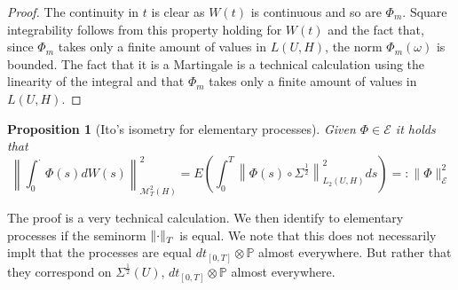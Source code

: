 \documentclass[12pt]{article}
\newtheorem{proposition}{Proposition}
\begin{document}
\begin{proof}
	The continuity in $t$ is clear as $W(t)$ is continuous and so are $\Phi_m$. Square integrability follows from this property holding for $W(t)$ and the fact that, since $\Phi_m$ takes only a finite amount of values in $L(U,H)$, the norm $\Phi_m(\omega)$ is bounded. The fact that it is a Martingale is a technical calculation using the linearity of the integral and that $\Phi_m$ takes only a finite amount of values in $L(U,H)$.
\end{proof}
\begin{proposition}[Ito's isometry for elementary processes]\label{ito elementary}
	Given $\Phi\in\mathcal{E}$ it holds that
	\begin{equation*}
		\left\|\int_{0}^\cdot \Phi(s) d W(s)\right\|_{\mathcal{M}_{T}^2(H)}^2=E\left(\int_{0}^{T}\left\|\Phi(s) \circ \Sigma^{\frac{1}{2}}\right\|_{L_2(U,H)}^2 d s\right)=:\|\Phi\|_{\mathcal{E}}^2
	\end{equation*}
\end{proposition}
The proof is a very technical calculation. We then identify to elementary processes if the seminorm $\norm{\cdot}_T$ is equal. We note that this does not necessarily implt that the processes are equal $dt_{[0,T]}\otimes\mathbb{P}$ almost everywhere. But rather that they correspond on $\Sigma^\frac{1}{2}(U)$, $dt_{[0,T]}\otimes\mathbb{P}$ almost everywhere.
\end{document}

